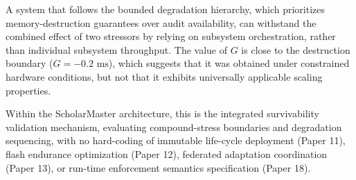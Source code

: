 \documentclass[conference]{IEEEtran}
\begin{document}
A system that follows the bounded degradation hierarchy, which prioritizes memory-destruction guarantees over audit availability, can withstand the combined effect of two stressors by relying on subsystem orchestration, rather than individual subsystem throughput. The value of $G$ is close to the destruction boundary ($G = -0.2\text{ ms}$), which suggests that it was obtained under constrained hardware conditions, but not that it exhibits universally applicable scaling properties.

Within the ScholarMaster architecture, this is the integrated survivability validation mechanism, evaluating compound-stress boundaries and degradation sequencing, with no hard-coding of immutable life-cycle deployment (Paper 11), flash endurance optimization (Paper 12), federated adaptation coordination (Paper 13), or run-time enforcement semantics specification (Paper 18).
\end{document}
